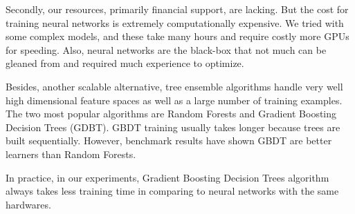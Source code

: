 Secondly, our resources, primarily financial support, are lacking. But the cost for training neural networks is extremely computationally expensive. We tried with some complex models, and these take many hours and require costly more GPUs for speeding. Also, neural networks are the black-box that not much can be gleaned from and required much experience to optimize.

Besides, another scalable alternative, tree ensemble algorithms handle very well high dimensional feature spaces as well as a large number of training examples. The two most popular algorithms are Random Forests and Gradient Boosting Decision Trees (GDBT). GBDT training usually takes longer because trees are built sequentially. However, benchmark results have shown GBDT are better learners than Random Forests.

In practice, in our experiments, Gradient Boosting Decision Trees algorithm always takes less training time in comparing to neural networks with the same hardwares.
